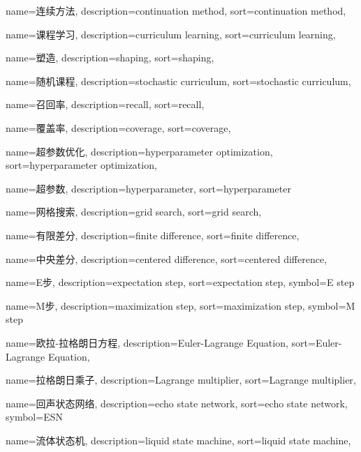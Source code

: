 {
  name=连续方法,
  description={continuation method},
  sort={continuation method},
}

{
  name=课程学习,
  description={curriculum learning},
  sort={curriculum learning},
}

{
  name=塑造, %
  description={shaping},
  sort={shaping},
}

{
  name=随机课程,
  description={stochastic curriculum},
  sort={stochastic curriculum},
}

{
  name=召回率,
  description={recall},
  sort={recall},
}

{
  name=覆盖率,
  description={coverage},
  sort={coverage},
}

{
  name=超参数优化,
  description={hyperparameter optimization},
  sort={hyperparameter optimization},
}

{
  name=超参数,
  description={hyperparameter},
  sort={hyperparameter}
}

{
  name=网格搜索,
  description={grid search},
  sort={grid search},
}

{
  name=有限差分,
  description={finite difference},
  sort={finite difference},
}

{
  name=中央差分,
  description={centered difference},
  sort={centered difference},
}

{
  name=E步,
  description={expectation step},
  sort={expectation step},
  symbol={E step}
}

{
  name=M步,
  description={maximization step},
  sort={maximization step},
  symbol={M step}
}

{
  name=欧拉-拉格朗日方程,
  description={Euler-Lagrange Equation},
  sort={Euler-Lagrange Equation},
}


{
	name=拉格朗日乘子,
	description={Lagrange multiplier},
	sort={Lagrange multiplier},
}

{
  name=回声状态网络,
  description={echo state network},
  sort={echo state network},
  symbol={ESN}
}

{
  name=流体状态机,
  description={liquid state machine},
  sort={liquid state machine},
}

